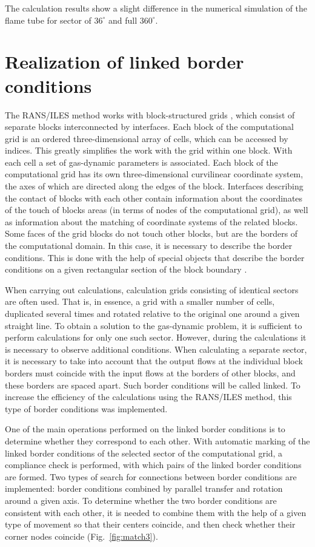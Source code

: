 \documentclass[
11pt,%
tightenlines,%
twoside,%
onecolumn,%
nofloats,%
nobibnotes,%
nofootinbib,%
superscriptaddress,%
noshowpacs,%
centertags]%
{revtex4}
\begin{document}
The calculation results show a slight difference in the numerical simulation of the flame tube for sector of $36^{\circ}$ and full $360^{\circ}$.

\section{Realization of linked border conditions}

The RANS/ILES method works with block-structured grids \cite{Farrashkhalvat,Liseikin}, which consist of separate blocks interconnected by interfaces.
Each block of the computational grid is an ordered three-dimensional array of cells, which can be accessed by indices.
This greatly simplifies the work with the grid within one block.
With each cell a set of gas-dynamic parameters is associated.
Each block of the computational grid has its own three-dimensional curvilinear coordinate system, the axes of which are directed along the edges of the block.
Interfaces describing the contact of blocks with each other contain information about the coordinates of the touch of blocks areas (in terms of nodes of the computational grid), as well as information about the matching of coordinate systems of the related blocks.
Some faces of the grid blocks do not touch other blocks, but are the borders of the computational domain.
In this case, it is necessary to describe the border conditions.
This is done with the help of special objects that describe the border conditions on a given rectangular section of the block boundary \cite{Rybakov}.

When carrying out calculations, calculation grids consisting of identical sectors are often used.
That is, in essence, a grid with a smaller number of cells, duplicated several times and rotated relative to the original one around a given straight line.
To obtain a solution to the gas-dynamic problem, it is sufficient to perform calculations for only one such sector.
However, during the calculations it is necessary to observe additional conditions.
When calculating a separate sector, it is necessary to take into account that the output flows at the individual block borders must coincide with the input flows at the borders of other blocks, and these borders are spaced apart.
Such border conditions will be called linked.
To increase the efficiency of the calculations using the RANS/ILES method, this type of border conditions was implemented.

One of the main operations performed on the linked border conditions is to determine whether they correspond to each other.
With automatic marking of the linked border conditions of the selected sector of the computational grid, a compliance check is performed, with which pairs of the linked border conditions are formed.
Two types of search for connections between border conditions are implemented: border conditions combined by parallel transfer and rotation around a given axis.
To determine whether the two border conditions are consistent with each other, it is needed to combine them with the help of a given type of movement so that their centers coincide, and then check whether their corner nodes coincide (Fig.~\ref{fig:match3}).
\end{document}
